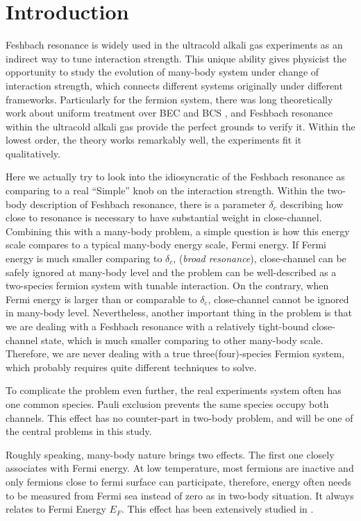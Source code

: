 
\chapter{Introduction}
Feshbach resonance is widely used in the ultracold alkali gas experiments as an indirect way to tune interaction strength.  This unique ability gives physicist the opportunity to study the evolution of many-body system under change of interaction strength, which connects different systems originally under different frameworks.  Particularly for the fermion system, there was long theoretically work about uniform treatment over BEC and BCS \cite{Eagles,LeggettCrossover,Nozieres,RanderiaBEC}, and Feshbach resonance within the ultracold alkali gas provide the perfect grounds to verify it.  Within the lowest order, the theory works remarkably well, the experiments fit it qualitatively.  

Here we actually try to look into the idiosyncratic of the Feshbach resonance as comparing to a real ``Simple'' knob on the interaction strength.  Within the two-body description of Feshbach resonance, there is a parameter $\delta_c$ describing how close to resonance is necessary to have substantial weight in close-channel.  Combining this with a many-body problem, a simple question is how this energy scale compares to a typical many-body energy scale, Fermi energy.  If Fermi energy is much smaller comparing to $\delta_c$, (\emph{broad resonance}), close-channel can be safely ignored at many-body level and the problem can be well-described as a two-species fermion system with tunable interaction.  On the contrary, when Fermi energy is larger than or comparable to $\delta_c$, close-channel cannot be ignored in many-body level.  Nevertheless, another important thing in the problem is that we are dealing with a Feshbach resonance with a relatively tight-bound close-channel state, which is much smaller comparing to other many-body scale.  Therefore, we are never dealing with a true three(four)-species Fermion system, which probably requires quite different techniques to solve.

To complicate the problem even further, the real experiments system often has one common species.  Pauli exclusion prevents the same species occupy both channels.  This effect has no counter-part in two-body problem, and will be one of the central problems in this study. 

Roughly speaking, many-body nature brings two effects.  The first one closely associates with Fermi energy.  At low temperature, most fermions are inactive and only fermions close to fermi surface can participate, therefore, energy often needs to be measured from Fermi sea instead of zero as in two-body situation.  It always relates to Fermi Energy $E_F$.  This effect has been extensively studied in \cite{GurarieNarrow}.

